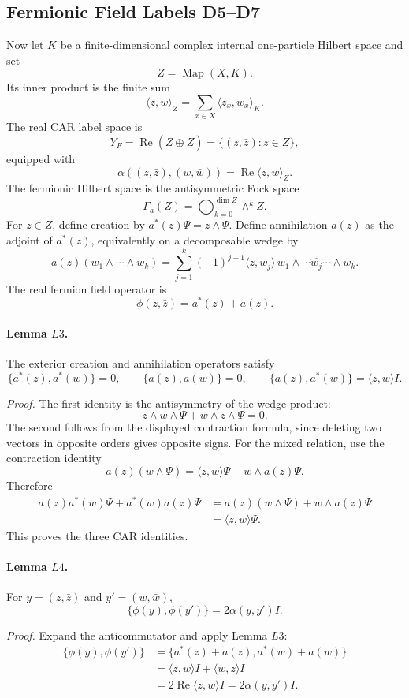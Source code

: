 \subsection{Fermionic Field Labels D5--D7}
Now let \(K\) be a finite-dimensional complex internal one-particle Hilbert
space and set
\[
  Z=\operatorname{Map}(X,K).
\]
Its inner product is the finite sum
\[
  \langle z,w\rangle_Z=\sum_{x\in X}\langle z_x,w_x\rangle_K.
\]
The real CAR label space is
\[
  Y_F=\operatorname{Re}(Z\oplus\overline Z)
      =\{(z,\bar z):z\in Z\},
\]
equipped with
\[
  \alpha((z,\bar z),(w,\bar w))=\operatorname{Re}\langle z,w\rangle_Z.
\]
The fermionic Hilbert space is the antisymmetric Fock space
\[
  \Gamma_a(Z)=\bigoplus_{k=0}^{\dim Z}\wedge^k Z.
\]
For \(z\in Z\), define creation by \(a^*(z)\Psi=z\wedge\Psi\).  Define
annihilation \(a(z)\) as the adjoint of \(a^*(z)\), equivalently on a
decomposable wedge by
\[
  a(z)(w_1\wedge\cdots\wedge w_k)
  =
  \sum_{j=1}^k(-1)^{j-1}\langle z,w_j\rangle\,
  w_1\wedge\cdots\widehat{w_j}\cdots\wedge w_k .
\]
The real fermion field operator is
\[
  \phi(z,\bar z)=a^*(z)+a(z).
\]

\paragraph{Lemma \(L3\).}
The exterior creation and annihilation operators satisfy
\[
  \{a^*(z),a^*(w)\}=0,\qquad
  \{a(z),a(w)\}=0,\qquad
  \{a(z),a^*(w)\}=\langle z,w\rangle I .
\]

\emph{Proof.}
The first identity is the antisymmetry of the wedge product:
\[
  z\wedge w\wedge\Psi+w\wedge z\wedge\Psi=0.
\]
The second follows from the displayed contraction formula, since deleting two
vectors in opposite orders gives opposite signs.  For the mixed relation, use
the contraction identity
\[
  a(z)(w\wedge\Psi)=\langle z,w\rangle\Psi-w\wedge a(z)\Psi .
\]
Therefore
\[
\begin{aligned}
  a(z)a^*(w)\Psi+a^*(w)a(z)\Psi
  &=a(z)(w\wedge\Psi)+w\wedge a(z)\Psi\\
  &=\langle z,w\rangle\Psi .
\end{aligned}
\]
This proves the three CAR identities.

\paragraph{Lemma \(L4\).}
For \(y=(z,\bar z)\) and \(y'=(w,\bar w)\),
\[
  \{\phi(y),\phi(y')\}=2\alpha(y,y')I .
\]

\emph{Proof.}
Expand the anticommutator and apply Lemma \(L3\):
\[
\begin{aligned}
  \{\phi(y),\phi(y')\}
  &=
  \{a^*(z)+a(z),a^*(w)+a(w)\}\\
  &=\langle z,w\rangle I+\langle w,z\rangle I\\
  &=2\operatorname{Re}\langle z,w\rangle I
   =2\alpha(y,y')I .
\end{aligned}
\]

